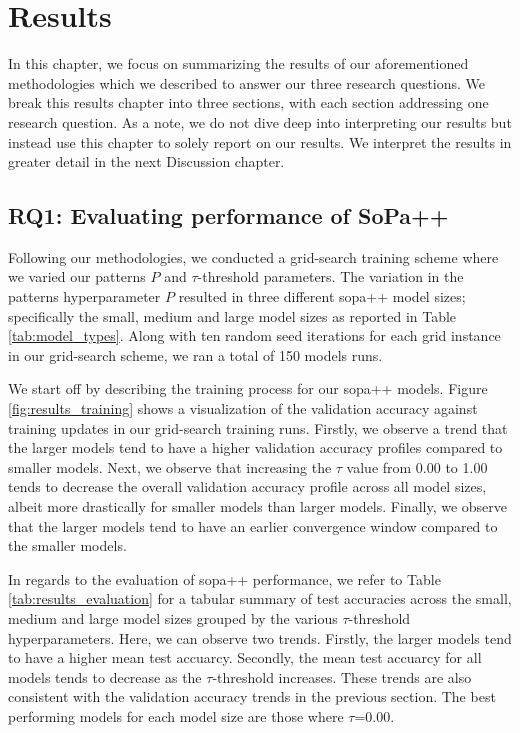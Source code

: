 \chapter{Results}

\label{chapter:results}

In this chapter, we focus on summarizing the results of our aforementioned
methodologies which we described to answer our three research questions. We
break this results chapter into three sections, with each section addressing one
research question. As a note, we do not dive deep into interpreting our results
but instead use this chapter to solely report on our results. We interpret the
results in greater detail in the next Discussion chapter.

\section{RQ1: Evaluating performance of SoPa++}

Following our methodologies, we conducted a grid-search training scheme where we
varied our patterns $P$ and $\tau$-threshold parameters. The variation in the
patterns hyperparameter $P$ resulted in three different \ac{sopa}++ model sizes;
specifically the small, medium and large model sizes as reported in Table
\ref{tab:model_types}. Along with ten random seed iterations for each grid
instance in our grid-search scheme, we ran a total of 150 models runs.

We start off by describing the training process for our \ac{sopa}++ models. Figure
\ref{fig:results_training} shows a visualization of the validation accuracy
against training updates in our grid-search training runs. Firstly, we
observe a trend that the larger models tend to have a higher validation accuracy
profiles compared to smaller models. Next, we observe that increasing the
$\tau$ value from 0.00 to 1.00 tends to decrease the overall validation accuracy
profile across all model sizes, albeit more drastically for smaller models than
larger models. Finally, we observe that the larger models tend to have an
earlier convergence window compared to the smaller models.

In regards to the evaluation of \ac{sopa}++ performance, we refer to Table
\ref{tab:results_evaluation} for a tabular summary of test accuracies across the
small, medium and large model sizes grouped by the various $\tau$-threshold
hyperparameters. Here, we can observe two trends. Firstly, the larger models
tend to have a higher mean test accuarcy. Secondly, the mean test accuarcy for
all models tends to decrease as the $\tau$-threshold increases. These trends are
also consistent with the validation accuracy trends in the previous section. The
best performing models for each model size are those where $\tau$=0.00.

